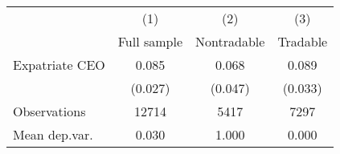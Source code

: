\begin{tabular}{l*{3}{c}}
\hline\hline
                    &\multicolumn{1}{c}{(1)}&\multicolumn{1}{c}{(2)}&\multicolumn{1}{c}{(3)}\\
                    &\multicolumn{1}{c}{Full sample}&\multicolumn{1}{c}{Nontradable}&\multicolumn{1}{c}{Tradable}\\
\hline
Expatriate CEO      &       0.085&       0.068&       0.089\\
                    &     (0.027)&     (0.047)&     (0.033)\\
\hline
Observations        &       12714&        5417&        7297\\
Mean dep.var.       &       0.030&       1.000&       0.000\\
\hline\hline
\end{tabular}
